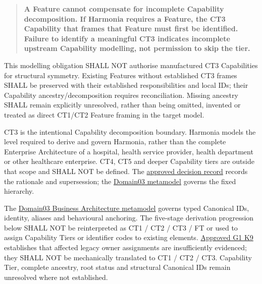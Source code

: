 \label{rad:tier-model:26}

\begin{quote}

\textbf{A Feature cannot compensate for incomplete Capability decomposition. If Harmonia requires a Feature, the CT3 Capability that frames that Feature must first be identified. Failure to identify a meaningful CT3 indicates incomplete upstream Capability modelling, not permission to skip the tier.}


\end{quote}
\label{rad:tier-model:28}

This modelling obligation SHALL NOT authorise manufactured CT3 Capabilities for structural symmetry. Existing Features without established CT3 frames SHALL be preserved with their established responsibilities and local IDs; their Capability ancestry/\allowbreak{}decomposition requires reconciliation. Missing ancestry SHALL remain explicitly unresolved, rather than being omitted, invented or treated as direct CT1/\allowbreak{}CT2 Feature framing in the target model.

\label{rad:tier-model:30}

CT3 is the intentional Capability decomposition boundary. Harmonia models the level required to derive and govern Harmonia, rather than the complete Enterprise Architecture of a hospital, health service provider, health department or other healthcare enterprise. CT4, CT5 and deeper Capability tiers are outside that scope and SHALL NOT be defined. The \href{https://github.com/fhirfactory/harmonia/blob/98410db60155198a75f74c79d98060070209faa1/docs/markdown/02-strategy/reviews/fixed-capability-decomposition-decision.md}{approved decision record} records the rationale and supersession; the \hyperref[rad:metamodel:33]{Domain03 metamodel} governs the fixed hierarchy.

\label{rad:tier-model:32}

The \hyperref[rad:metamodel:319]{Domain03 Business Architecture metamodel} governs typed Canonical IDs, identity, aliases and behavioural anchoring. The five-stage derivation progression below SHALL NOT be reinterpreted as CT1 /\allowbreak{} CT2 /\allowbreak{} CT3 /\allowbreak{} FT or used to assign Capability Tiers or identifier codes to existing elements. \hyperref[rad:k9:1392]{Approved G1 K9} establishes that affected legacy owner assignments are insufficiently evidenced; they SHALL NOT be mechanically translated to CT1 /\allowbreak{} CT2 /\allowbreak{} CT3. Capability Tier, complete ancestry, root status and structural Canonical IDs remain unresolved where not established.

